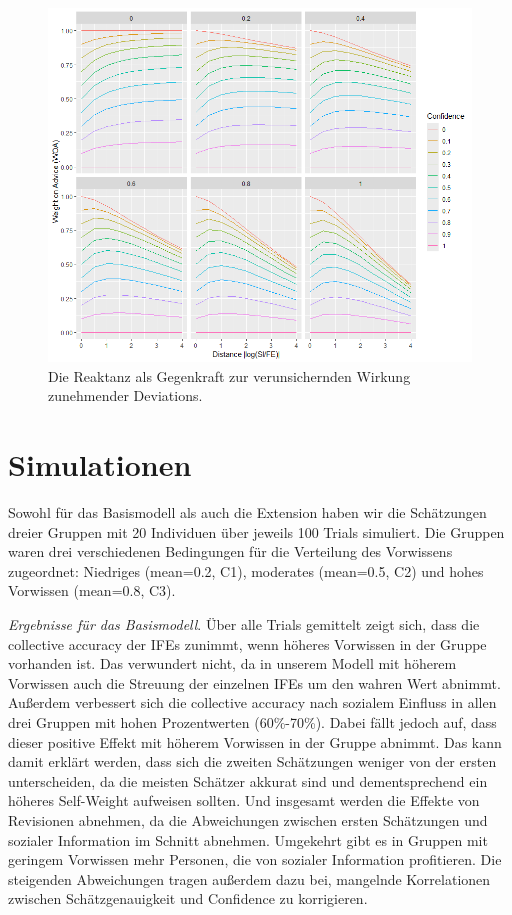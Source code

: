 \documentclass[
  man,mask,floatsintext]{apa6}
\begin{document}
\begin{figure}
\centering
\includegraphics{Abbildungen/ext_react_dev.png}
\caption{\label{fig:my-figure6}Die Reaktanz als Gegenkraft zur verunsichernden Wirkung zunehmender Deviations.}
\end{figure}

\section{Simulationen}\label{simulationen}

Sowohl für das Basismodell als auch die Extension haben wir die Schätzungen dreier Gruppen mit 20 Individuen über jeweils 100 Trials simuliert. Die Gruppen waren drei verschiedenen Bedingungen für die Verteilung des Vorwissens zugeordnet: Niedriges (mean=0.2, C1), moderates (mean=0.5, C2) und hohes Vorwissen (mean=0.8, C3).

\emph{Ergebnisse für das Basismodell}. Über alle Trials gemittelt zeigt sich, dass die collective accuracy der IFEs zunimmt, wenn höheres Vorwissen in der Gruppe vorhanden ist. Das verwundert nicht, da in unserem Modell mit höherem Vorwissen auch die Streuung der einzelnen IFEs um den wahren Wert abnimmt. Außerdem verbessert sich die collective accuracy nach sozialem Einfluss in allen drei Gruppen mit hohen Prozentwerten (60\%-70\%). Dabei fällt jedoch auf, dass dieser positive Effekt mit höherem Vorwissen in der Gruppe abnimmt. Das kann damit erklärt werden, dass sich die zweiten Schätzungen weniger von der ersten unterscheiden, da die meisten Schätzer akkurat sind und dementsprechend ein höheres Self-Weight aufweisen sollten. Und insgesamt werden die Effekte von Revisionen abnehmen, da die Abweichungen zwischen ersten Schätzungen und sozialer Information im Schnitt abnehmen. Umgekehrt gibt es in Gruppen mit geringem Vorwissen mehr Personen, die von sozialer Information profitieren. Die steigenden Abweichungen tragen außerdem dazu bei, mangelnde Korrelationen zwischen Schätzgenauigkeit und Confidence zu korrigieren.
\end{document}

